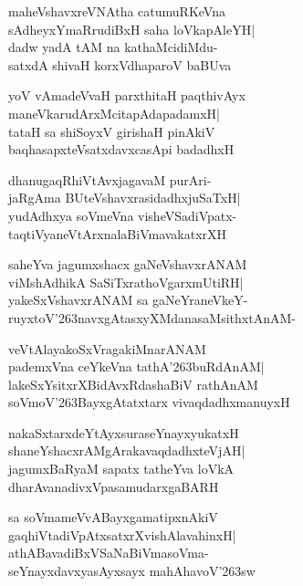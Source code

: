 \documentclass[twoside,12pt,openright]{book}
\def\S{\char'263}
\newcounter{shloka}[chapter]
\begin{document}
\begin{shloka}%
maheVshavxreVNAtha catumuRKeVna\\
sAdheyxYmaRrudiBxH saha loVkapAleYH|\\
dadw yadA tAM na kathaMcidiMdu-\\
satxdA shivaH korxVdhaparoV baBUva
\end{shloka}

\begin{shloka}%
yoV vAmadeVvaH parxthitaH paqthivAyx\\
maneVkarudArxMcitapAdapadamxH|\\
tataH sa shiSoyxV girishaH pinAkiV\\
baqhasapxteVsatxdavxcasApi badadhxH
\end{shloka}

\begin{shloka}%
dhanugaqRhiVtAvxjagavaM purAri-\\
jaRgAma BUteVshavxrasidadhxjuSaTxH|\\
yudAdhxya soVmeVna visheVSadiVpatx-\\
taqtiVyaneVtArxnalaBiVmavakatxrXH
\end{shloka}

\begin{shloka}%
saheYva jagumxshacx gaNeVshavxrANAM\\
viMshAdhikA SaSiTxrathoVgarxmUtiRH|\\
yakeSxVshavxrANAM sa gaNeYraneVkeY-\\
ruyxtoV\S navxgAtasxyXMdanasaMsithxtAnAM-
\end{shloka}

\begin{shloka}%
veVtAlayakoSxVragakiMnarANAM\\
pademxVna ceYkeVna tathA\S buRdAnAM|\\
lakeSxYsitxrXBidAvxRdashaBiV rathAnAM\\
soVmoV\S BayxgAtatxtarx vivaqdadhxmanuyxH
\end{shloka}

\begin{shloka}%
nakaSxtarxdeYtAyxsuraseYnayxyukatxH\\
shaneYshacxrAMgArakavaqdadhxteVjAH|\\
jagumxBaRyaM sapatx tatheYva loVkA\\
dharAvanadivxVpasamudarxgaBARH
\end{shloka}

\begin{shloka}%
sa soVmameVvABayxgamatipxnAkiV\\
gaqhiVtadiVpAtxsatxrXvishAlavahinxH|\\
athABavadiBxVSaNaBiVmasoVma-\\
seYnayxdavxyasAyxsayx mahAhavoV\S sw
\end{shloka}
\end{document}
